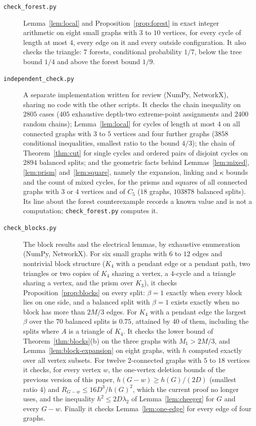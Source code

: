 \begin{description}
\item[\texttt{check\_forest.py}] Lemma~\ref{lem:local} and Proposition~\ref{prop:forest} in exact integer arithmetic on eight small graphs with $3$ to $10$ vertices, for every cycle of length at most $4$, every edge on it and every outside configuration. It also checks the triangle: $7$ forests, conditional probability $1/7$, below the tree bound $1/4$ and above the forest bound $1/9$.

\item[\texttt{independent\_check.py}] A separate implementation written for review (NumPy, NetworkX), sharing no code with the other scripts. It checks the chain inequality on $2805$ cases ($405$ exhaustive depth-two extreme-point assignments and $2400$ random chains); Lemma~\ref{lem:local} for cycles of length at most $4$ on all connected graphs with $3$ to $5$ vertices and four further graphs ($3858$ conditional inequalities, smallest ratio to the bound $4/3$); the chain of Theorem~\ref{thm:cut} for single cycles and ordered pairs of disjoint cycles on $2894$ balanced splits; and the geometric facts behind Lemmas~\ref{lem:mixed}, \ref{lem:prism} and~\ref{lem:square}, namely the expansion, linking and $\kappa$ bounds and the count of mixed cycles, for the prisms and squares of all connected graphs with $3$ or $4$ vertices and of $C_5$ ($18$ graphs, $103878$ balanced splits). Its line about the forest counterexample records a known value and is not a computation; \texttt{check\_forest.py} computes it.
\item[\texttt{check\_blocks.py}] The block results and the electrical lemmas, by exhaustive enumeration (NumPy, NetworkX). For six small graphs with $6$ to $12$ edges and nontrivial block structure ($K_4$ with a pendant edge or a pendant path, two triangles or two copies of $K_4$ sharing a vertex, a $4$-cycle and a triangle sharing a vertex, and the prism over $K_3$), it checks Proposition~\ref{prop:blocks} on every split: $\beta=1$ exactly when every block lies on one side, and a balanced split with $\beta=1$ exists exactly when no block has more than $2M/3$ edges. For $K_4$ with a pendant edge the largest $\beta$ over the $70$ balanced splits is $0.75$, attained by $40$ of them, including the splits where $A$ is a triangle of $K_4$. It checks the lower bound of Theorem~\ref{thm:blocks}(b) on the three graphs with $M_1>2M/3$, and Lemma~\ref{lem:block-expansion} on eight graphs, with $h$ computed exactly over all vertex subsets. For twelve 2-connected graphs with $5$ to $18$ vertices it checks, for every vertex $w$, the one-vertex deletion bounds of the previous version of this paper, $h(G-w)\ge h(G)/(2D)$ (smallest ratio $4$) and $R_{G-w}\le16D^3/h(G)^2$, which the current proof no longer uses, and the inequality $h^2\le2D\lambda_2$ of Lemma~\ref{lem:cheeger} for $G$ and every $G-w$. Finally it checks Lemma~\ref{lem:one-edge} for every edge of four graphs.


\end{description}
